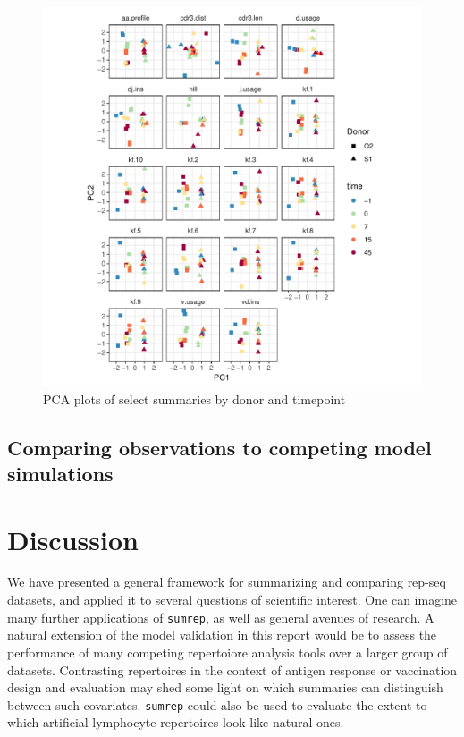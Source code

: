 \documentclass{article}
\begin{document}
\begin{figure}
    \includegraphics[width=\linewidth]{Figures/tcr_pca.pdf}
    \caption{PCA plots of select summaries by donor and timepoint}
    \label{fig:TCR_PCA}
\end{figure}

\subsection*{Comparing observations to competing model simulations}

\section*{Discussion}
We have presented a general framework for summarizing and comparing rep-seq datasets, and applied it to several questions of scientific interest.
One can imagine many further applications of \texttt{sumrep}, as well as general avenues of research.
A natural extension of the model validation in this report would be to assess the performance of many competing repertoiore analysis tools over a larger group of datasets.
Contrasting repertoires in the context of antigen response or vaccination design and evaluation may shed some light on which summaries can distinguish between such covariates.
\texttt{sumrep} could also be used to evaluate the extent to which artificial lymphocyte repertoires look like natural ones\cite{Finlay2012}.
\end{document}
